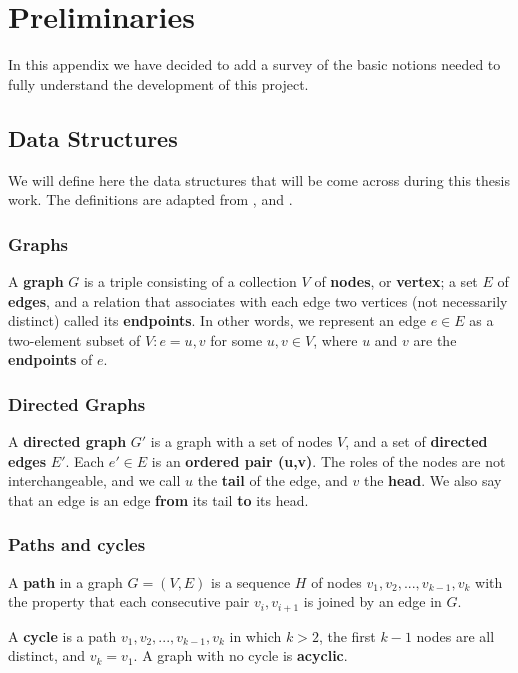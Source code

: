 \chapter{Preliminaries}\label{app:prel}
In this appendix we have decided to add a survey of the basic notions needed to fully understand the development of this project.
\section{Data Structures}
We will define here the data structures that will be come across during this thesis work. The definitions are adapted from \cite{kleinberg2006algorithm},\cite{russell1995modern} and \cite{west2001introduction}.
\subsection{Graphs}
\begin{definition}
\label{def:graph}
A \textbf{graph} $G$ is a triple consisting of a collection $V$ of \textbf{nodes}, or \textbf{vertex}; a set $E$ of \textbf{edges}, and a relation that associates with each edge two vertices (not necessarily distinct) called its \textbf{endpoints}. In other words, we represent an edge $e\in E$ as a two-element subset of $V:e={u,v}$ for some $u,v\in V$, where $u$ and $v$ are the \textbf{endpoints} of $e$. 
\end{definition}

\subsection{Directed Graphs}
\begin{definition}
\label{def:dirgraph}
A \textbf{directed graph} $G'$ is a graph with a set of nodes $V$, and a set of \textbf{directed edges} $E'$. Each $e'\in E$ is an \textbf{ordered pair (u,v)}. The roles of the nodes are not interchangeable, and we call $u$ the \textbf{tail} of the edge, and $v$ the \textbf{head}. We also say that an edge is an edge \textbf{from} its tail \textbf{to} its head.
\end{definition}

\subsection{Paths and cycles}
\begin{definition}
A \textbf{path} in a graph $G=(V,E)$ is a sequence $H$ of nodes $v_1,v_2,...,v_{k-1}, v_k$ with the property that each consecutive pair $v_i, v_{i+1}$ is joined by an edge in $G$.
\end{definition}
\begin{definition}
A \textbf{cycle} is a path $v_1,v_2,...,v_{k-1}, v_k$ in which $k>2$, the first $k-1$ nodes are all distinct, and $v_k=v_1$. A graph with no cycle is \textbf{acyclic}.
\end{definition}

